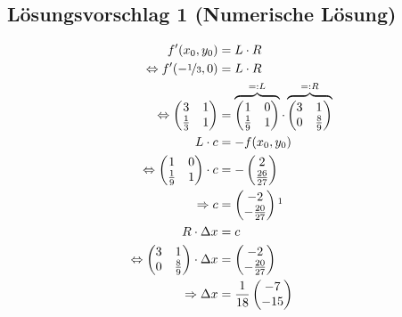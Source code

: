 \subsection*{Lösungsvorschlag 1 (Numerische Lösung)}
\begin{align}
%
	f'(x_0,y_0)	&= L \cdot R \\
	\Leftrightarrow f'(-\nicefrac{1}{3}, 0)	&= L \cdot R \\
	\Leftrightarrow \begin{pmatrix}
		3     & 1\\
		\frac{1}{3} & 1
	\end{pmatrix}
	&=
	\overbrace{\begin{pmatrix}
		1      & 0\\
		\frac{1}{9} & 1
	\end{pmatrix}}^{=: L} \cdot
	\overbrace{\begin{pmatrix}
		3 & 1\\
		0      & \frac{8}{9}
	\end{pmatrix}}^{=: R}\\
%
	L \cdot c	&= -f(x_0,y_0) \\
	\Leftrightarrow
	\begin{pmatrix}
		1      & 0\\
		\frac{1}{9} & 1
	\end{pmatrix}
	\cdot c
	&= -
		\begin{pmatrix}
		2\\
		\frac{26}{27}
	\end{pmatrix}\\
	\Rightarrow
	c &=		\begin{pmatrix}
		-2\\
		-\frac{20}{27}
	\end{pmatrix}\footnotemark\\
%
	R\cdot \Delta x &= c\\
	\Leftrightarrow
	\begin{pmatrix}
		3 & 1\\
		0      & \frac{8}{9}
	\end{pmatrix}
	\cdot \Delta x &=
	\begin{pmatrix}
		-2\\
		-\frac{20}{27}
	\end{pmatrix}\\
	\Rightarrow \Delta x &= \frac{1}{18}
	\begin{pmatrix}
		-7\\
		-15
	\end{pmatrix}
\end{align}

